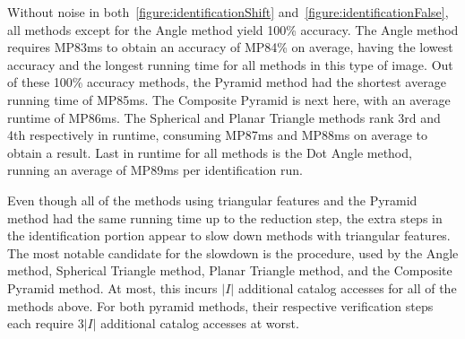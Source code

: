 \begin{figure}
\end{figure}

Without noise in both~\autoref{figure:identificationShift} and~\autoref{figure:identificationFalse}, all methods except
for the Angle method yield 100\% accuracy.
The Angle method requires MP83ms to obtain an accuracy of MP84\% on average, having the lowest accuracy and the longest
running time for all methods in this type of image.
Out of these 100\% accuracy methods, the Pyramid method had the shortest average running time of MP85ms.
The Composite Pyramid is next here, with an average runtime of MP86ms.
The Spherical and Planar Triangle methods rank 3rd and 4th respectively in runtime, consuming MP87ms and MP88ms on
average to obtain a result.
Last in runtime for all methods is the Dot Angle method, running an average of MP89ms per identification run.

Even though all of the methods using triangular features and the Pyramid method had the same running time up to the
reduction step, the extra steps in the identification portion appear to slow down methods with triangular features.
The most notable candidate for the slowdown is the  procedure, used by the Angle method, Spherical Triangle
method, Planar Triangle method, and the Composite Pyramid method.
At most, this incurs $|I|$ additional catalog accesses for all of the methods above.
For both pyramid methods, their respective verification steps each require $3|I|$ additional catalog accesses at worst.

